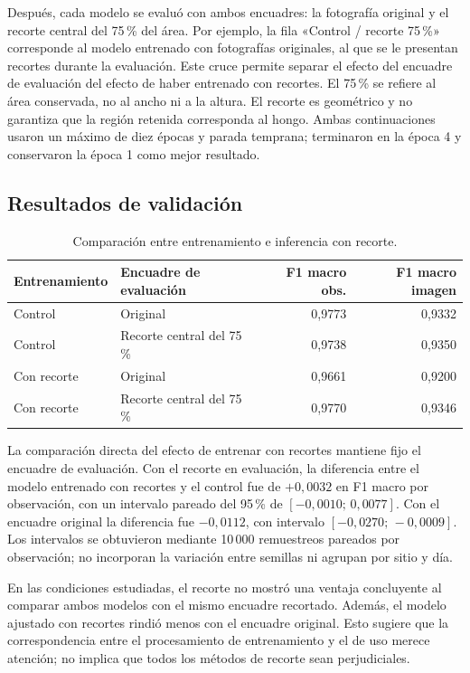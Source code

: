 \documentclass[11pt,a4paper]{article}
\begin{document}
Después, cada modelo se evaluó con ambos encuadres: la fotografía original y
el recorte central del 75\,\% del área. Por ejemplo, la fila «Control / recorte
75\,\%» corresponde al modelo entrenado con fotografías originales, al que se
le presentan recortes durante la evaluación. Este cruce permite separar el
efecto del encuadre de evaluación del efecto de haber entrenado con recortes.
El 75\,\% se refiere al área conservada, no al ancho ni a la altura. El recorte
es geométrico y no garantiza que la región retenida corresponda al hongo.
Ambas continuaciones usaron un máximo de diez épocas y parada temprana;
terminaron en la época 4 y conservaron la época 1 como mejor resultado.

\subsection{Resultados de validación}
\begin{table}[H]
\centering
\caption{Comparación entre entrenamiento e inferencia con recorte.}
\label{tab:recortes}
\begin{tabular}{llrr}
\toprule
Entrenamiento & Encuadre de evaluación & F1 macro obs. & F1 macro imagen \\
\midrule
Control & Original & 0,9773 & 0,9332 \\
Control & Recorte central del 75\,\% & 0,9738 & 0,9350 \\
Con recorte & Original & 0,9661 & 0,9200 \\
Con recorte & Recorte central del 75\,\% & 0,9770 & 0,9346 \\
\bottomrule
\end{tabular}
\end{table}

La comparación directa del efecto de entrenar con recortes mantiene fijo el
encuadre de evaluación. Con el recorte en evaluación, la diferencia entre el
modelo entrenado con recortes y el control fue de $+0{,}0032$ en F1 macro por observación, con un
intervalo pareado del 95\,\% de $[-0{,}0010;\,0{,}0077]$. Con el encuadre
original la diferencia fue $-0{,}0112$, con intervalo
$[-0{,}0270;\,-0{,}0009]$. Los intervalos se obtuvieron mediante 10\,000
remuestreos pareados por observación; no incorporan la variación entre semillas
ni agrupan por sitio y día.

En las condiciones estudiadas, el recorte no mostró una ventaja concluyente al
comparar ambos modelos con el mismo encuadre recortado. Además, el modelo
ajustado con recortes rindió menos con el encuadre original. Esto sugiere que
la correspondencia entre el procesamiento de entrenamiento y el de uso merece
atención; no implica que todos los métodos de recorte sean perjudiciales.
\end{document}
